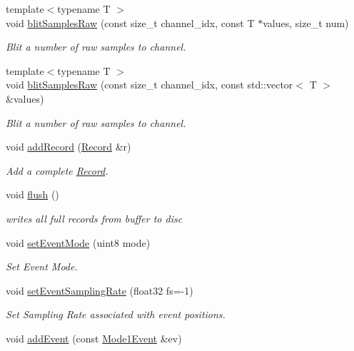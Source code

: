 \begin{DoxyCompactItemize}
{\footnotesize template$<$typename T $>$ }\\void \hyperlink{classgdf_1_1_writer_a2faf6a7c8aa18f81aadd0ff42eeb5caf}{blitSamplesRaw} (const size\_\-t channel\_\-idx, const T $\ast$values, size\_\-t num)
\begin{DoxyCompactList}\small\item\em Blit a number of raw samples to channel. \item\end{DoxyCompactList}\item 
{\footnotesize template$<$typename T $>$ }\\void \hyperlink{classgdf_1_1_writer_ae9eb09e9e7017fafaa6c367ec74d66bb}{blitSamplesRaw} (const size\_\-t channel\_\-idx, const std::vector$<$ T $>$ \&values)
\begin{DoxyCompactList}\small\item\em Blit a number of raw samples to channel. \item\end{DoxyCompactList}\item 
void \hyperlink{classgdf_1_1_writer_aa067a56c9699ad0c0a9fbebf83724dec}{addRecord} (\hyperlink{classgdf_1_1_record}{Record} \&r)
\begin{DoxyCompactList}\small\item\em Add a complete \hyperlink{classgdf_1_1_record}{Record}. \item\end{DoxyCompactList}\item 
\hypertarget{classgdf_1_1_writer_a14c39a92ac6f19312b2561363283d3e4}{
void \hyperlink{classgdf_1_1_writer_a14c39a92ac6f19312b2561363283d3e4}{flush} ()}
\label{classgdf_1_1_writer_a14c39a92ac6f19312b2561363283d3e4}

\begin{DoxyCompactList}\small\item\em writes all full records from buffer to disc \item\end{DoxyCompactList}\item 
void \hyperlink{classgdf_1_1_writer_ac8b0924c5b5721d01274e73c02b0d69f}{setEventMode} (uint8 mode)
\begin{DoxyCompactList}\small\item\em Set Event Mode. \item\end{DoxyCompactList}\item 
void \hyperlink{classgdf_1_1_writer_aeabb4626bd62684d0c9e5d3222e83fff}{setEventSamplingRate} (float32 fs=-\/1)
\begin{DoxyCompactList}\small\item\em Set Sampling Rate associated with event positions. \item\end{DoxyCompactList}\item 
\hypertarget{classgdf_1_1_writer_ab0a2c1b89c23f5d46144447253ada5ca}{
void \hyperlink{classgdf_1_1_writer_ab0a2c1b89c23f5d46144447253ada5ca}{addEvent} (const \hyperlink{structgdf_1_1_mode1_event}{Mode1Event} \&ev)}
\label{classgdf_1_1_writer_ab0a2c1b89c23f5d46144447253ada5ca}


\end{DoxyCompactItemize}
